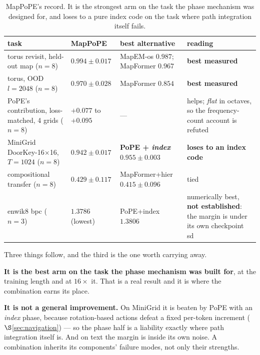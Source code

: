 \documentclass[11pt]{article}
\begin{document}
\begin{table}[htbp]\centering\small
\caption{MapPoPE's record. It is the strongest arm on the task the phase mechanism was designed for, and loses to a pure index code on the task where path integration itself fails.}
\label{tab:mappope}
\begin{tabular}{@{}p{4.5cm}p{3.1cm}p{3.3cm}p{3.4cm}@{}}
\toprule
task & MapPoPE & best alternative & reading \\
\midrule
torus revisit, held-out map ($n{=}8$) & $\mathbf{0.994 \pm 0.017}$ & MapEM-os $0.987$; MapFormer $0.967$ & \textbf{best measured} \\[2pt]
torus, OOD $l = 2048$ ($n{=}8$) & $\mathbf{0.970 \pm 0.028}$ & MapFormer $0.854$ & \textbf{best measured} \\[2pt]
PoPE's contribution, loss-matched, 4 grids ($n{=}8$) & $+0.077$ to $+0.095$ & --- & helps; \emph{flat} in octaves, so the frequency-count account is refuted \\[2pt]
MiniGrid DoorKey-16$\times$16, $T{=}1024$ ($n{=}8$) & $0.942 \pm 0.017$ & \textbf{PoPE + \emph{index}} $0.955 \pm 0.003$ & \textbf{loses to an index code} \\[2pt]
compositional transfer ($n{=}8$) & $0.429 \pm 0.117$ & MapFormer+hier $0.415 \pm 0.096$ & tied \\[2pt]
enwik8 bpc ($n{=}3$) & $1.3786$ (lowest) & PoPE+index $1.3806$ & numerically best, \textbf{not established}: the margin is under its own checkpoint sd \\
\bottomrule
\end{tabular}
\end{table}

\noindent Three things follow, and the third is the one worth carrying away.

\textbf{It is the best arm on the task the phase mechanism was built for}, at the
training length and at $16\times$ it. That is a real result and it is where the
combination earns its place.

\textbf{It is not a general improvement.} On MiniGrid it is beaten by PoPE with an
\emph{index} phase, because rotation-based actions defeat a fixed per-token
increment ($\S$\ref{sec:navigation}) --- so the phase half is a liability exactly
where path integration itself is. And on text the margin is inside its own noise.
A combination inherits its components' failure modes, not only their strengths.
\end{document}

